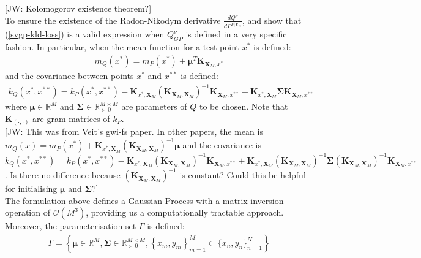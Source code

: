 \documentclass[twoside,11pt]{article}
\newcommand{\jw}[1]{{\color{gray} [JW: #1]}}
\begin{document}
\jw{Kolomogorov existence theorem?}
\\To ensure the existence of the Radon-Nikodym derivative $\frac{dQ^{\nu}}{d P^{F \vert \mathbf{Y}_N}}$, \cite{matthews2016sparse} and \cite{titsias2009variational} show that (\ref{svgp-kld-loss}) is a valid expression when $Q_{GP}^{\nu}$ is defined in a very specific fashion. In particular, when the mean function for a test point $x^*$ is defined:
\begin{align}
    m_Q(x^*) = m_P(x^*) + \mathbf{\mu}^T\mathbf{K}_{\mathbf{X}_M, x^*}
    \label{svgp-mean}
\end{align}
and the covariance between points $x^*$ and $x^{**}$ is defined:
\begin{align}
        k_Q(x^*, x^{**}) = k_P(x^*, x^{**}) - \mathbf{K}_{x^*, \mathbf{X}_M} \left(\mathbf{K}_{\mathbf{X}_M, \mathbf{X}_M}\right)^{-1}\mathbf{K}_{\mathbf{X}_M, x^{**}} + \mathbf{K}_{x^*, \mathbf{X}_M} \mathbf{\Sigma}\mathbf{K}_{\mathbf{X}_M, x^{**}}
    \label{svgp-covariance}
\end{align}
where $\mathbf{\mu} \in \mathbb{R}^{M}$ and $\mathbf{\Sigma} \in \mathbb{R}^{M\times M}_{\succ 0}$ are parameters of $Q$ to be chosen. Note that $\mathbf{K}_{(\cdot, \cdot)}$ are gram matrices of $k_P$.
\\\jw{This was from Veit's gwi-fs paper. In other papers, the mean is $m_Q(x) =  m_P(x^*) + \mathbf{K}_{x^*, \mathbf{X}_M} \left(\mathbf{K}_{\mathbf{X}_M, \mathbf{X}_M}\right)^{-1} \mathbf{\mu}$ and the covariance is $k_Q(x^*, x^{**}) = k_P(x^*, x^{**}) - \mathbf{K}_{x^*, \mathbf{X}_M} \left(\mathbf{K}_{\mathbf{X}_M, \mathbf{X}_M}\right)^{-1}\mathbf{K}_{\mathbf{X}_M, x^{**}} + \mathbf{K}_{x^*, \mathbf{X}_M} \left(\mathbf{K}_{\mathbf{X}_M, \mathbf{X}_M}\right)^{-1} \mathbf{\Sigma}\left(\mathbf{K}_{\mathbf{X}_M, \mathbf{X}_M}\right)^{-1}\mathbf{K}_{\mathbf{X}_M, x^{**}}$. Is there no difference because $\left(\mathbf{K}_{\mathbf{X}_M, \mathbf{X}_M}\right)^{-1}$ is constant? Could this be helpful for initialising $\mathbf{\mu}$ and $\mathbf{\Sigma}$?}
\\The formulation above defines a Gaussian Process with a matrix inversion operation of $\mathcal{O}(M^3)$, providing us a computationally tractable approach. Moreover, the parameterisation set $\Gamma$ is defined:
\begin{align}
    \Gamma = \left\{\mathbf{\mu} \in \mathbb{R}^{M}, \mathbf{\Sigma} \in \mathbb{R}^{M\times M}_{\succ 0}, \left\{x_m, y_m\right\}_{m=1}^{M} \subset \{x_n, y_n\}_{n=1}^{N}\right\}
    \label{svgp-parameter-set}
\end{align} 
\end{document}
